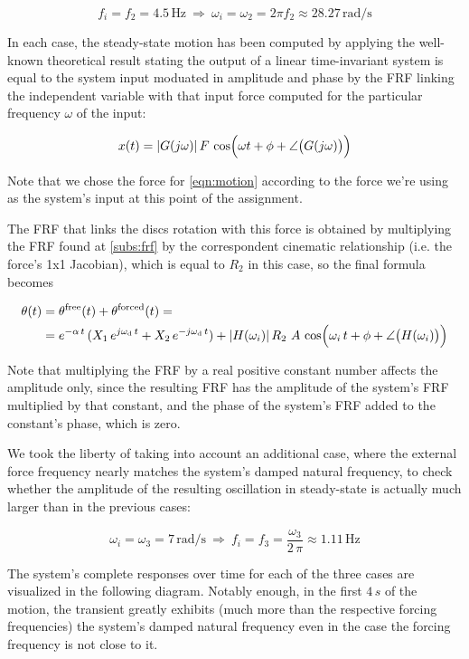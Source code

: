 \documentclass[a4paper,12pt,oneside]{article}
\begin{document}
\[
	f_i = f_2 = 4.5 \, \text{Hz} ~ \Rightarrow ~
		\omega_i = \omega_2 = 2 \pi f_2 \approx 28.27 \, \text{rad/s}
\]

In each case, the steady-state motion has been computed by applying the well-known theoretical result stating the output of a linear time-invariant system is equal to the system input moduated in amplitude and phase by the FRF linking the independent variable with that input force computed for the particular frequency $ \omega $ of the input:

\begin{equation}
\label{eqn:lti_output}
	x(t) = |G(j \omega)| \, F \,
		\cos\Bigl(\omega t + \phi + \angle\bigl(G(j \omega)\bigr)\Bigr)
\end{equation}

Note that we chose the force for \eqref{eqn:motion} according to the force we're using as the system's input at this point of the assignment.

The FRF that links the discs rotation with this force is obtained by multiplying the FRF found at \ref{subs:frf} by the correspondent cinematic relationship (i.e. the force's 1x1 Jacobian), which is equal to $ R_2 $ in this case, so the final formula becomes

\[ \begin{split}
	\theta(t) & = \theta^\textup{free}(t) + \theta^\textup{forced}(t) = \\
						& = e^{-\alpha \, t} \,
							(X_1 \, e^{j \omega_\textup{d} \, t} +
							X_2 \, e^{- j \omega_\textup{d} \, t}) +
							|H(\omega_i)| \, R_2 \, \, A \,
							\cos\Bigl(\omega_i \, t + \phi + \angle\bigl(H(\omega_i)\bigr)\Bigr)
\end{split} \]

Note that multiplying the FRF by a real positive constant number affects the amplitude only, since the resulting FRF has the amplitude of the system's FRF multiplied by that constant, and the phase of the system's FRF added to the constant's phase, which is zero.

We took the liberty of taking into account an additional case, where the external force frequency nearly matches the system's damped natural frequency, to check whether the amplitude of the resulting oscillation in steady-state is actually much larger than in the previous cases:

\[
	\omega_i = \omega_3 = 7 \, \text{rad/s} ~ \Rightarrow ~
		f_i = f_3 = \frac{\omega_3}{2 \, \pi} \approx 1.11 \, \text{Hz}
\]

The system's complete responses over time for each of the three cases are visualized in the following diagram. Notably enough, in the first $ 4 \, s $ of the motion, the transient greatly exhibits (much more than the respective forcing frequencies) the system's damped natural frequency even in the case the forcing frequency is not close to it.
\end{document}
